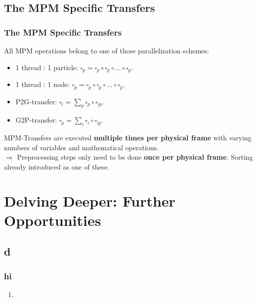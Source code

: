 \documentclass{beamer}
\let\oldcite=\cite
\renewcommand{\cite}[1]{\textcolor[rgb]{.55,.55,.89}{\oldcite{#1}}}
\begin{document}
\subsection{The MPM Specific Transfers}
\begin{frame}
\frametitle{The MPM Specific Transfers}
All MPM operations belong to one of those parallelization schemes:
\begin{itemize}
 \item 1 thread : 1 particle: $\square_p = \square_p \circ \square_p \circ ... \circ \square_p$.
 \item 1 thread : 1 node: $\square_p = \square_p \circ \square_p \circ ... \circ \square_p$.
 \item P2G-transfer: $\square_i = \sum_p \square_p \circ \square_{ip}.$
 \item G2P-transfer: $\square_p = \sum_i \square_i \circ \square_{ip}.$
\end{itemize}
\vfill
MPM-Transfers are executed \textbf{multiple times per physical frame} with varying numbers of variables and mathematical operations.\\\vspace{5}
$\Rightarrow$ Preprocessing steps only need to be done \textbf{once per physical frame}. Sorting already introduced as one of these.
\end{frame}
\section{Delving Deeper: Further Opportunities}

\subsection{d}

\begin{frame}
\frametitle{hi}
  \begin{enumerate}
    \item \cite{MPM:COURSE}
  \end{enumerate}
\end{frame}

\printbibliography
\end{document}
